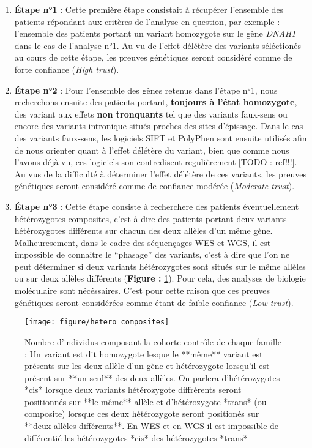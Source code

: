 \documentclass[12pt,twoside]{reedthesis}
\theoremstyle{definition}
\theoremstyle{definition}
\theoremstyle{remark}
\begin{document}
  \begin{enumerate}
  \def\labelenumi{\arabic{enumi}.}
  \item
    \textbf{Étape n°1} : Cette première étape consistait à récupérer
    l'ensemble des patients répondant aux critères de l'analyse en
    question, par exemple : l'ensemble des patients portant un variant
    homozygote sur le gène \emph{DNAH1} dans le cas de l'analyse n°1. Au
    vu de l'effet délétère des variants séléctionés au cours de cette
    étape, les preuves génétiques seront considéré comme de forte
    confiance (\emph{High trust}).
  \item
    \textbf{Étape n°2} : Pour l'ensemble des gènes retenus dans l'étape
    n°1, nous recherchons ensuite des patients portant, \textbf{toujours à
    l'état homozygote}, des variant aux effets \textbf{non tronquants} tel
    que des variants faux-sens ou encore des variants intronique situés
    proches des sites d'épissage. Dans le cas des variants faux-sens, les
    logiciels SIFT et PolyPhen sont ensuite utilisés afin de nous orienter
    quant à l'effet délétère du variant, bien que comme nous l'avons déjà
    vu, ces logiciels son contredisent regulièrement {[}TODO : ref!!!{]}.
    Au vus de la difficulté à déterminer l'effet délétère de ces variants,
    les preuves génétiques seront considéré comme de confiance modérée
    (\emph{Moderate trust}).
  \item
    \textbf{Étape n°3} : Cette étape consiste à recherchere des patients
    éventuellement hétérozygotes composites, c'est à dire des patients
    portant deux variants hétérozygotes différents sur chacun des deux
    allèles d'un même gène. Malheuresement, dans le cadre des séquençages
    WES et WGS, il est impossible de connaitre le ``phasage'' des
    variants, c'est à dire que l'on ne peut déterminer si deux variants
    hétérozygotes sont situés sur le même allèles ou sur deux allèles
    différents (\textbf{Figure : }\ref{fig:compositehet}). Pour cela, des
    analyses de biologie moléculaire sont nécéssaires. C'est pour cette
    raison que ces preuves génétiques seront considérées comme étant de
    faible confiance (\emph{Low trust}).
  \end{enumerate}
  
  \begin{figure}
  
  {\centering \texttt{[image: figure/hetero\_composites]} 
  
  }
  
  \caption[Représentation schématique des ....TODO]{Nombre d'individus composant la cohorte contrôle de chaque famille : Un variant est dit homozygote lesque le **même** variant est présents sur les deux allèle d'un gène et hétérozygote lorsqu'il est présent sur **un seul** des deux allèles. On parlera d'hétérozygotes *cis* lorsque deux variants hétérozygote diffrérents seront positionnés sur **le même** allèle et d'hétérozygote *trans* (ou composite) lorsque ces deux hétérozygote seront positionés sur **deux allèles différents**. En WES et en WGS il est impossible de différentié les hétérozygotes *cis* des hétérozygotes *trans*}\label{fig:compositehet}
  \end{figure}
  
\end{document}
